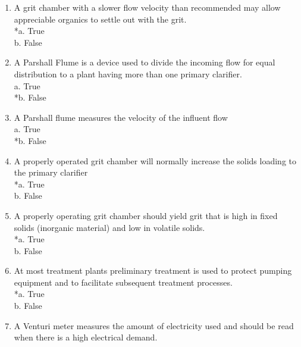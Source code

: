 \begin{enumerate}
\vspace{0.4cm}
\item  A grit chamber with a slower flow velocity than recommended may allow appreciable organics to settle out with the grit. \\

*a. True \\
b. False 

\vspace{0.4cm}
\item  A Parshall Flume is a device used to divide the incoming flow for equal distribution to a plant having more than one primary clarifier. \\

a. True \\
*b. False 

\vspace{0.4cm}
\item  A Parshall flume measures the velocity of the influent flow \\

a. True \\
*b. False 

\vspace{0.4cm}
\item  A properly operated grit chamber will normally increase the solids loading to the primary clarifier \\

*a. True \\
b. False 

\vspace{0.4cm}
\item  A properly operating grit chamber should yield grit that is high in fixed solids (inorganic material) and low in volatile solids. \\

*a. True \\
b. False 

\vspace{0.4cm}
\item  At most treatment plants preliminary treatment is used to protect pumping equipment and to facilitate subsequent treatment processes. \\

*a. True \\
b. False 

\vspace{0.4cm}
\item  A Venturi meter measures the amount of electricity used and should be read when there is a high electrical demand. \\


\end{enumerate}
